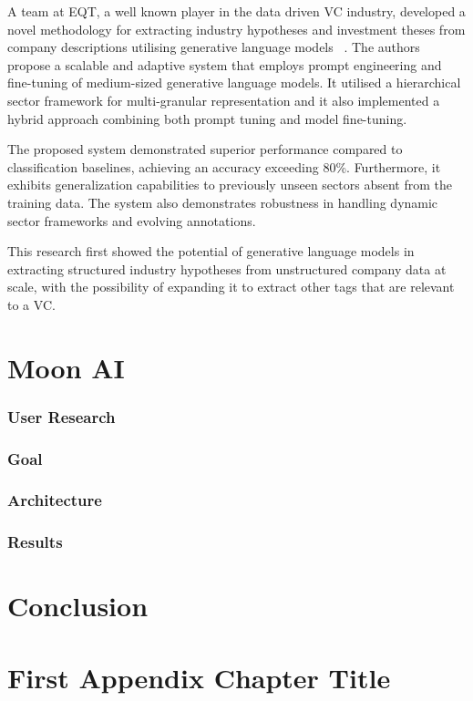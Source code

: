 \documentclass[a4paper, oneside]{discothesis}
\begin{document}
A team at EQT, a well known player in the data driven VC industry, developed a novel methodology for extracting industry hypotheses and investment theses from company descriptions utilising generative language models ~\cite{lele_cao_infer_industry_sector}. The authors propose a scalable and adaptive system that employs prompt engineering and fine-tuning of medium-sized generative language models. It utilised a hierarchical sector framework for multi-granular representation and it also implemented a hybrid approach combining both prompt tuning and model fine-tuning.

The proposed system demonstrated superior performance compared to classification baselines, achieving an accuracy exceeding 80\%. Furthermore, it exhibits generalization capabilities to previously unseen sectors absent from the training data. The system also demonstrates robustness in handling dynamic sector frameworks and evolving annotations.

This research first showed the potential of generative language models in extracting structured industry hypotheses from unstructured company data at scale, with the possibility of expanding it to extract other tags that are relevant to a VC. 

\chapter{Moon AI}
\subsection{User Research}
\subsection{Goal}
\subsection{Architecture}
\subsection{Results}

\chapter{Conclusion}





\appendix
\chapter{First Appendix Chapter Title}
\end{document}
